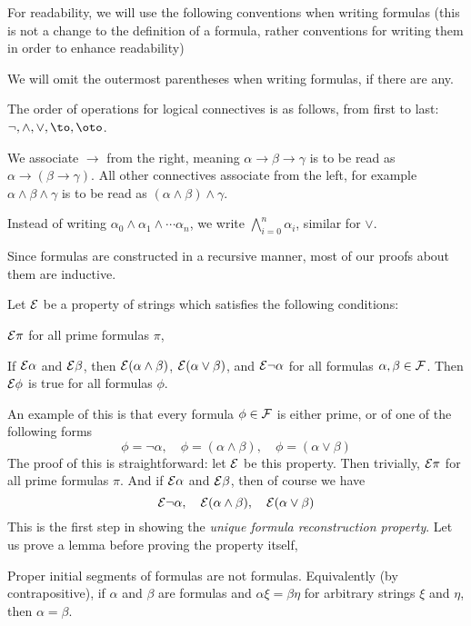 For readability, we will use the following conventions when writing formulas (this is not a change to the definition of a formula, rather conventions for writing them in order to enhance readability)
\benum
    \item We will omit the outermost parentheses when writing formulas, if there are any.
    \item The order of operations for logical connectives is as follows, from first to last: $\neg,\land,\lor,\to,\oto$.
    \item We associate $\to$ from the right, meaning $\alpha\to\beta\to\gamma$ is to be read as $\alpha\to(\beta\to\gamma)$.
    All other connectives associate from the left, for example $\alpha\land\beta\land\gamma$ is to be read as $(\alpha\land\beta)\land\gamma$.
    \item Instead of writing $\alpha_0\land\alpha_1\land\cdots\alpha_n$, we write $\bigwedge_{i=0}^n\alpha_i$, similar for $\lor$.
\eenum

Since formulas are constructed in a recursive manner, most of our proofs about them are inductive.

\bprin[title=Principle of Formula Induction, name=predforminduct]

    Let ${\cal E}$ be a property of strings which satisfies the following conditions:
    \benum
        \item ${\cal E}\pi$ for all prime formulas $\pi$,
        \item If ${\cal E}\alpha$ and ${\cal E}\beta$, then ${\cal E}(\alpha\land\beta)$, ${\cal E}(\alpha\lor\beta)$, and ${\cal E}\neg\alpha$ for all formulas $\alpha,\beta\in{\cal F}$.
    \eenum
    Then ${\cal E}\phi$ is true for all formulas $\phi$.

\eprin

An example of this is that every formula $\phi\in{\cal F}$ is either prime, or of one of the following forms
$$ \phi=\neg\alpha,\quad\phi=(\alpha\land\beta),\quad\phi=(\alpha\lor\beta) $$
The proof of this is straightforward: let ${\cal E}$ be this property.
Then trivially, ${\cal E}\pi$ for all prime formulas $\pi$.
And if ${\cal E}\alpha$ and ${\cal E}\beta$, then of course we have
$$ {\cal E}\neg\alpha,\quad{\cal E}(\alpha\land\beta),\quad{\cal E}(\alpha\lor\beta) $$
This is the first step in showing the {\it unique formula reconstruction property}.
Let us prove a lemma before proving the property itself,

\blemm

    Proper initial segments of formulas are not formulas.
    Equivalently (by contrapositive), if $\alpha$ and $\beta$ are formulas and $\alpha\xi=\beta\eta$ for arbitrary strings $\xi$ and $\eta$, then $\alpha=\beta$.

